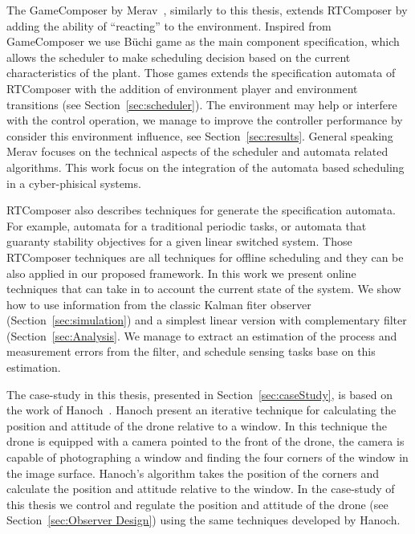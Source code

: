 \documentclass[ twoside, 12pt ]{article}
\begin{document}
The GameComposer by Merav~\cite{Merav}, similarly to this thesis, extends RTComposer by adding the ability of ``reacting'' to the environment.
Inspired from GameComposer we use B\"uchi game as the main component specification, which allows the scheduler to make scheduling decision based on the current characteristics of the plant.
Those games extends the specification automata of RTComposer with the addition of environment player and environment transitions (see Section~\ref{sec:scheduler}).
The environment may help or interfere with the control operation, we manage to improve the controller performance by consider this environment influence, see Section~\ref{sec:results}.
General speaking Merav focuses on the technical aspects of the scheduler and automata related algorithms.
This work focus on the integration of the automata based scheduling in a cyber-phisical systems.

RTComposer also describes techniques for generate the specification automata. For example, automata for a traditional periodic tasks, or automata that guaranty stability objectives for a given linear switched system.
Those RTComposer techniques are all techniques for offline scheduling and they can be also applied in our proposed framework.
In this work we present online techniques that can take in to account the current state of the system.
We show how to use information from the classic Kalman fiter observer (Section~\ref{sec:simulation}) and a simplest linear version with complementary filter (Section~\ref{sec:Analysis}.
We manage to extract an estimation of the process and measurement errors from the filter, and schedule sensing tasks base on this estimation.






The case-study in this thesis, presented in Section~\ref{sec:caseStudy},  is based on the work of Hanoch~\cite{Hanoch ??}.
Hanoch present an iterative technique for calculating the position and attitude of the drone relative to a window.
In this technique the drone is equipped with a camera pointed to the front of the drone, the camera is capable of photographing a window and finding the four corners of the window in the image surface.
Hanoch's algorithm takes the position of the corners and calculate the position and attitude relative to the window.
In the case-study of this thesis we control and regulate the position and attitude of the drone (see Section~\ref{sec:Observer Design}) using the same techniques developed by Hanoch.
\end{document}
